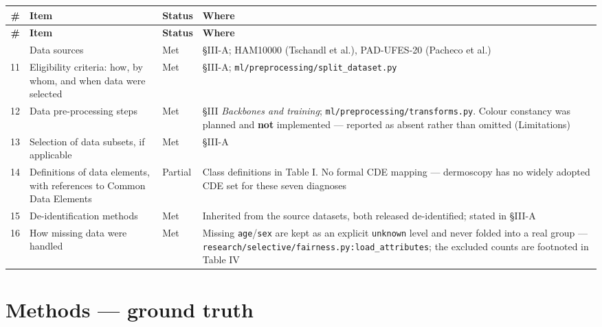 \documentclass[10pt,a4paper]{article}
\begin{document}
\begin{longtable}{@{}rp{}lp{}@{}}
\toprule
\textbf{\#} & \textbf{Item} & \textbf{Status} & \textbf{Where} \\
\midrule
\endfirsthead
\toprule
\textbf{\#} & \textbf{Item} & \textbf{Status} & \textbf{Where} \\
\midrule
\endhead
\bottomrule
\endfoot
10 & Data sources & Met & \S{}III-A; HAM10000 (Tschandl et al.), PAD-UFES-20 (Pacheco et al.) \\
11 & Eligibility criteria: how, by whom, and when data were selected & Met & \S{}III-A; \texttt{ml/preprocessing/split\_dataset.py} \\
12 & Data pre-processing steps & Met & \S{}III \emph{Backbones and training}; \texttt{ml/preprocessing/transforms.py}. Colour constancy was planned and \textbf{not} implemented --- reported as absent rather than omitted (Limitations) \\
13 & Selection of data subsets, if applicable & Met & \S{}III-A \\
14 & Definitions of data elements, with references to Common Data Elements & Partial & Class definitions in Table I. No formal CDE mapping --- dermoscopy has no widely adopted CDE set for these seven diagnoses \\
15 & De-identification methods & Met & Inherited from the source datasets, both released de-identified; stated in \S{}III-A \\
16 & How missing data were handled & Met & Missing \texttt{age}/\texttt{sex} are kept as an explicit \texttt{unknown} level and never folded into a real group --- \texttt{research/selective/fairness.py:load\_attributes}; the excluded counts are footnoted in Table IV \\
\end{longtable}


\section*{Methods --- ground truth}
\end{document}
